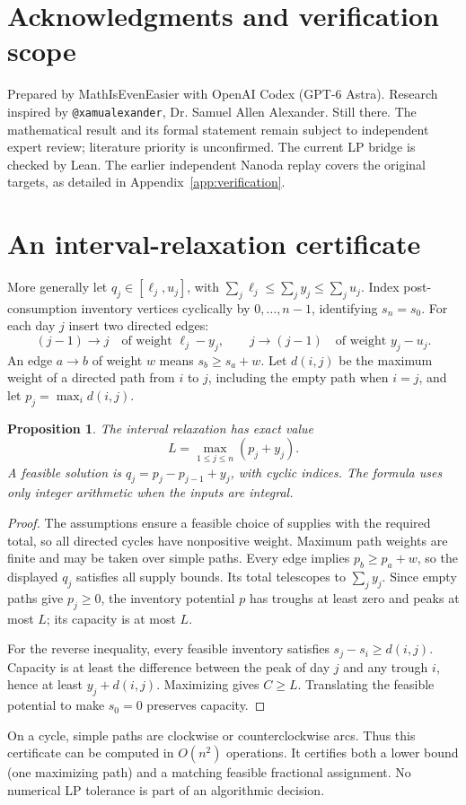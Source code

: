 \documentclass[11pt]{article}
\newtheorem{proposition}{Proposition}
\begin{document}
\section*{Acknowledgments and verification scope}
Prepared by MathIsEvenEasier with OpenAI Codex (GPT-6 Astra).
Research inspired by \texttt{@xamualexander}, Dr. Samuel Allen Alexander.
Still there.
The mathematical result and its formal statement remain subject to
independent expert review; literature priority is unconfirmed. The current
LP bridge is checked by Lean. The earlier independent Nanoda replay covers
the original targets, as detailed in Appendix~\ref{app:verification}.

\appendix
\section{An interval-relaxation certificate}\label{app:interval}
More generally let $q_j\in[\ell_j,u_j]$, with
$\sum_j\ell_j\le\sum_j y_j\le\sum_j u_j$. Index post-consumption inventory
vertices cyclically by $0,\ldots,n-1$, identifying $s_n=s_0$.
For each day $j$ insert two directed edges:
\[
(j-1)\longrightarrow j\quad\text{of weight }\ell_j-y_j,
\qquad
j\longrightarrow(j-1)\quad\text{of weight }y_j-u_j.
\]
An edge $a\to b$ of weight $w$ means $s_b\ge s_a+w$.
Let $d(i,j)$ be the maximum weight of a directed path from $i$ to $j$,
including the empty path when $i=j$, and let $p_j=\max_i d(i,j)$.

\begin{proposition}
The interval relaxation has exact value
\[
L=\max_{1\le j\le n}(p_j+y_j).
\]
A feasible solution is $q_j=p_j-p_{j-1}+y_j$, with cyclic indices.
The formula uses only integer arithmetic when the inputs are integral.
\end{proposition}
\begin{proof}
The assumptions ensure a feasible choice of supplies with the required total,
so all directed cycles have nonpositive weight. Maximum path weights are
finite and may be taken over simple paths. Every edge implies
$p_b\ge p_a+w$, so the displayed $q_j$ satisfies all supply bounds.
Its total telescopes to $\sum_jy_j$. Since empty paths give $p_j\ge0$,
the inventory potential $p$ has troughs at least zero and peaks at most $L$;
its capacity is at most $L$.

For the reverse inequality, every feasible inventory satisfies
$s_j-s_i\ge d(i,j)$. Capacity is at least the difference between the peak
of day $j$ and any trough $i$, hence at least $y_j+d(i,j)$. Maximizing gives
$C\ge L$. Translating the feasible potential to make $s_0=0$ preserves capacity.
\end{proof}
On a cycle, simple paths are clockwise or counterclockwise arcs. Thus this
certificate can be computed in $O(n^2)$ operations. It certifies both a lower
bound (one maximizing path) and a matching feasible fractional assignment.
No numerical LP tolerance is part of an algorithmic decision.
\end{document}
